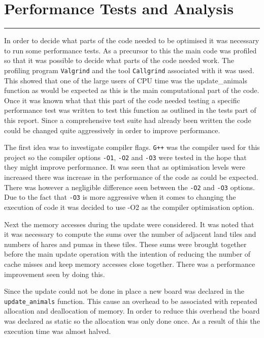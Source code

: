 \section{Performance Tests and Analysis}
\vspace{-2em}\rule{\textwidth}{1pt}\vspace{1em}

In order to decide what parts of the code needed to be optimised it was necessary to run some performance tests.
As a precursor to this the main code was profiled so that it was possible to decide what parts of the code needed work.
The profiling program \texttt{Valgrind} and the tool \texttt{Callgrind} associated with it was used.
This showed that one of the large users of CPU time was the update\_animals function as would be expected as this is the main computational part of the code.
Once it was known what that this part of the code needed testing a specific performance test was written to test this function as outlined in the tests part of this report.
Since a comprehensive test suite had already been written the code could be changed quite aggressively in order to improve performance.

The first idea was to investigate compiler flags.
\texttt{G++} was the compiler used for this project so the compiler options \texttt{-O1}, \texttt{-O2} and \texttt{-O3} were tested in the hope that they might improve performance.
It was seen that as optimisation levels were increased there was increase in the performance of the code as could be expected.
There was however a negligible difference seen between the \texttt{-O2} and \texttt{-O3} options.
Due to the fact that \texttt{-O3} is more aggressive when it comes to changing the execution of code it was decided to use -O2 as the compiler optimisation option.

Next the memory accesses during the update were considered.
It was noted that it was necessary to compute the sums over the number of adjacent land tiles and numbers of hares and pumas in these tiles.
These sums were brought together before the main update operation with the intention of reducing the number of cache misses and keep memory accesses close together.
There was a performance improvement seen by doing this.

Since the update could not be done in place a new board was declared in the \texttt{update\_animals} function.
This cause an overhead to be associated with repeated allocation and deallocation of memory.
In order to reduce this overhead the board was declared as static so the allocation was only done once.
As a result of this the execution time was almost halved.

